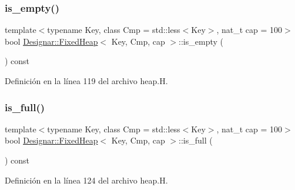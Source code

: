 \subsubsection{\texorpdfstring{is\+\_\+empty()}{is\_empty()}}
{\footnotesize\ttfamily template$<$typename Key, class Cmp = std\+::less$<$\+Key$>$, nat\+\_\+t cap = 100$>$ \\
bool \hyperlink{class_designar_1_1_fixed_heap}{Designar\+::\+Fixed\+Heap}$<$ Key, Cmp, cap $>$\+::is\+\_\+empty (\begin{DoxyParamCaption}{ }\end{DoxyParamCaption}) const\hspace{0.3cm}{\ttfamily [inline]}}



Definición en la línea 119 del archivo heap.\+H.

\mbox{\label{class_designar_1_1_fixed_heap_a85af858c5200cd8777925e4ae17ca9d2}} 
\subsubsection{\texorpdfstring{is\+\_\+full()}{is\_full()}}
{\footnotesize\ttfamily template$<$typename Key, class Cmp = std\+::less$<$\+Key$>$, nat\+\_\+t cap = 100$>$ \\
bool \hyperlink{class_designar_1_1_fixed_heap}{Designar\+::\+Fixed\+Heap}$<$ Key, Cmp, cap $>$\+::is\+\_\+full (\begin{DoxyParamCaption}{ }\end{DoxyParamCaption}) const\hspace{0.3cm}{\ttfamily [inline]}}



Definición en la línea 124 del archivo heap.\+H.

\mbox{\label{class_designar_1_1_fixed_heap_adb8f27056847e1b788e815db1a59db67}} 
